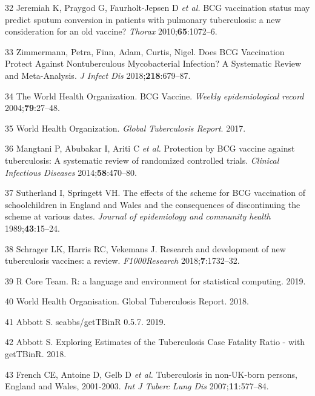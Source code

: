 \documentclass[11pt,twoside]{bristolthesis}
\begin{document}
  \leavevmode\hypertarget{ref-Jeremiah2010}{}%
  32 Jeremiah K, Praygod G, Faurholt-Jepsen D \emph{et al.} BCG vaccination status may predict sputum conversion in patients with pulmonary tuberculosis: a new consideration for an old vaccine? \emph{Thorax} 2010;\textbf{65}:1072--6.
  
  \leavevmode\hypertarget{ref-Zimmermann:2018io}{}%
  33 Zimmermann, Petra, Finn, Adam, Curtis, Nigel. Does BCG Vaccination Protect Against Nontuberculous Mycobacterial Infection? A Systematic Review and Meta-Analysis. \emph{J Infect Dis} 2018;\textbf{218}:679--87.
  
  \leavevmode\hypertarget{ref-The2004}{}%
  34 The World Health Organization. BCG Vaccine. \emph{Weekly epidemiological record} 2004;\textbf{79}:27--48.
  
  \leavevmode\hypertarget{ref-WHO2017}{}%
  35 World Health Organization. \emph{Global Tuberculosis Report}. 2017.
  
  \leavevmode\hypertarget{ref-Mangtani2014}{}%
  36 Mangtani P, Abubakar I, Ariti C \emph{et al.} Protection by BCG vaccine against tuberculosis: A systematic review of randomized controlled trials. \emph{Clinical Infectious Diseases} 2014;\textbf{58}:470--80.
  
  \leavevmode\hypertarget{ref-Sutherland1989}{}%
  37 Sutherland I, Springett VH. The effects of the scheme for BCG vaccination of schoolchildren in England and Wales and the consequences of discontinuing the scheme at various dates. \emph{Journal of epidemiology and community health} 1989;\textbf{43}:15--24.
  
  \leavevmode\hypertarget{ref-Schrager:2018ip}{}%
  38 Schrager LK, Harris RC, Vekemans J. Research and development of new tuberculosis vaccines: a review. \emph{F1000Research} 2018;\textbf{7}:1732--32.
  
  \leavevmode\hypertarget{ref-RCoreTeam2019}{}%
  39 R Core Team. R: a language and environment for statistical computing. 2019.
  
  \leavevmode\hypertarget{ref-WHO:2018}{}%
  40 World Health Organisation. Global Tuberculosis Report. 2018.
  
  \leavevmode\hypertarget{ref-Abbott:2019}{}%
  41 Abbott S. seabbs/getTBinR 0.5.7. 2019.
  
  \leavevmode\hypertarget{ref-Abbott:2018}{}%
  42 Abbott S. Exploring Estimates of the Tuberculosis Case Fatality Ratio - with getTBinR. 2018.
  
  \leavevmode\hypertarget{ref-French2007}{}%
  43 French CE, Antoine D, Gelb D \emph{et al.} Tuberculosis in non-UK-born persons, England and Wales, 2001-2003. \emph{Int J Tuberc Lung Dis} 2007;\textbf{11}:577--84.
  
\end{document}
